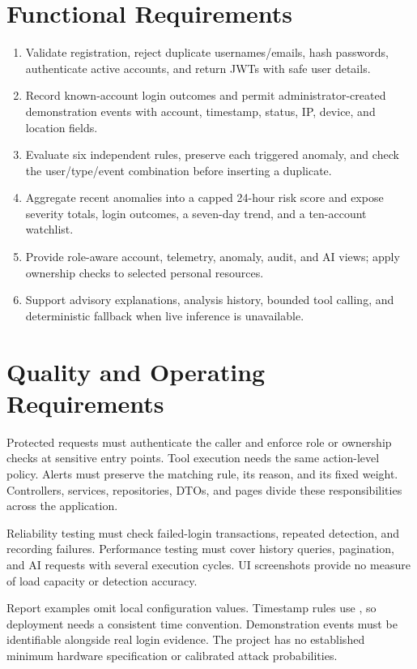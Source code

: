 \clearpage\section{Functional Requirements}
\begin{enumerate}
\item Validate registration, reject duplicate usernames/emails, hash passwords, authenticate active accounts, and return JWTs with safe user details.
\item Record known-account login outcomes and permit administrator-created demonstration events with account, timestamp, status, IP, device, and location fields.
\item Evaluate six independent rules, preserve each triggered anomaly, and check the user/type/event combination before inserting a duplicate.
\item Aggregate recent anomalies into a capped 24-hour risk score and expose severity totals, login outcomes, a seven-day trend, and a ten-account watchlist.
\item Provide role-aware account, telemetry, anomaly, audit, and AI views; apply ownership checks to selected personal resources.
\item Support advisory explanations, analysis history, bounded tool calling, and deterministic fallback when live inference is unavailable.
\end{enumerate}

\section{Quality and Operating Requirements}
Protected requests must authenticate the caller and enforce role or ownership checks at sensitive entry points. Tool execution needs the same action-level policy. Alerts must preserve the matching rule, its reason, and its fixed weight. Controllers, services, repositories, DTOs, and pages divide these responsibilities across the application.

Reliability testing must check failed-login transactions, repeated detection, and recording failures. Performance testing must cover history queries, pagination, and AI requests with several execution cycles. UI screenshots provide no measure of load capacity or detection accuracy.

Report examples omit local configuration values. Timestamp rules use , so deployment needs a consistent time convention. Demonstration events must be identifiable alongside real login evidence. The project has no established minimum hardware specification or calibrated attack probabilities.
